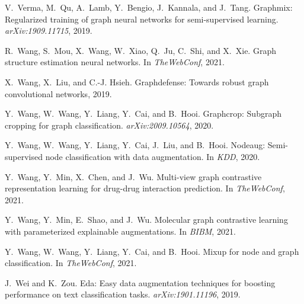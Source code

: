 \documentclass[11pt]{article}
\begin{document}
\begin{thebibliography}{10}
\begin{small}
V.~Verma, M.~Qu, A.~Lamb, Y.~Bengio, J.~Kannala, and J.~Tang.
\newblock Graphmix: Regularized training of graph neural networks for
  semi-supervised learning.
\newblock \emph{arXiv:1909.11715}, 2019{}.

R.~Wang, S.~Mou, X.~Wang, W.~Xiao, Q.~Ju, C.~Shi, and X.~Xie.
\newblock Graph structure estimation neural networks.
\newblock In \emph{TheWebConf}, 2021{}.

X.~Wang, X.~Liu, and C.-J. Hsieh.
\newblock Graphdefense: Towards robust graph convolutional networks, 2019.

Y.~Wang, W.~Wang, Y.~Liang, Y.~Cai, and B.~Hooi.
\newblock Graphcrop: Subgraph cropping for graph classification.
\newblock \emph{arXiv:2009.10564}, 2020{}.

Y.~Wang, W.~Wang, Y.~Liang, Y.~Cai, J.~Liu, and B.~Hooi.
\newblock Nodeaug: Semi-supervised node classification with data augmentation.
\newblock In \emph{KDD}, 2020{}.

Y.~Wang, Y.~Min, X.~Chen, and J.~Wu.
\newblock Multi-view graph contrastive representation learning for drug-drug
  interaction prediction.
\newblock In \emph{TheWebConf}, 2021{}.

Y.~Wang, Y.~Min, E.~Shao, and J.~Wu.
\newblock Molecular graph contrastive learning with parameterized explainable
  augmentations.
\newblock In \emph{BIBM}, 2021{}.

Y.~Wang, W.~Wang, Y.~Liang, Y.~Cai, and B.~Hooi.
\newblock Mixup for node and graph classification.
\newblock In \emph{TheWebConf}, 2021{}.

J.~Wei and K.~Zou.
\newblock Eda: Easy data augmentation techniques for boosting performance on
  text classification tasks.
\newblock \emph{arXiv:1901.11196}, 2019.


\end{small}
\end{thebibliography}
\end{document}
